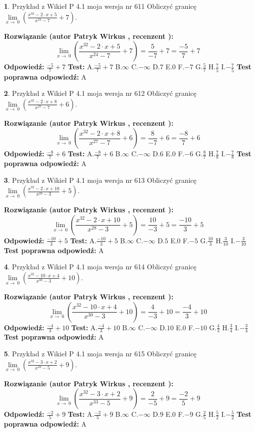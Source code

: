 \documentclass[12pt, a4paper]{article}
\theoremstyle{definition} %
\newtheorem{zad}{}
\newcommand{\zadStart}[1]{\begin{zad}#1\newline}
\newcommand{\zadStop}{\end{zad}}
\newcommand{\rozwStart}[2]{\noindent \textbf{Rozwiązanie (autor #1 , recenzent #2): }\newline}
\newcommand{\rozwStop}{\newline}
\newcommand{\odpStart}{\noindent \textbf{Odpowiedź:}\newline}
\newcommand{\odpStop}{\newline}
\newcommand{\testStart}{\noindent \textbf{Test:}\newline}
\newcommand{\testStop}{\newline}
\newcommand{\kluczStart}{\noindent \textbf{Test poprawna odpowiedź:}\newline}
\newcommand{\kluczStop}{\newline}
\begin{document}
\zadStart{Przykład z Wikieł P 4.1 moja wersja nr 611}
Obliczyć granicę $\lim\limits_{x\to\ 0}(\frac{x^{32}-2 \cdot x +5}{x^{24}-7}+7)$.
\zadStop
\rozwStart{Patryk Wirkus}{}
$$\lim\limits_{x\to\ 0}(\frac{x^{32}-2 \cdot x +5}{x^{24}-7}+7)=\frac{5}{-7}+7=\frac{-5}{7}+7$$
\rozwStop
\odpStart
$\frac{-5}{7}+7$
\odpStop
\testStart
A.$\frac{-5}{7}+7$
B.$\infty$
C.$-\infty$
D.$7$
E.$0$
F.$-7$
G.$\frac{5}{7}$
H.$\frac{7}{5}$
I.$-\frac{7}{5}$
\testStop
\kluczStart
A
\kluczStop



\zadStart{Przykład z Wikieł P 4.1 moja wersja nr 612}
Obliczyć granicę $\lim\limits_{x\to\ 0}(\frac{x^{32}-2 \cdot x +8}{x^{27}-7}+6)$.
\zadStop
\rozwStart{Patryk Wirkus}{}
$$\lim\limits_{x\to\ 0}(\frac{x^{32}-2 \cdot x +8}{x^{27}-7}+6)=\frac{8}{-7}+6=\frac{-8}{7}+6$$
\rozwStop
\odpStart
$\frac{-8}{7}+6$
\odpStop
\testStart
A.$\frac{-8}{7}+6$
B.$\infty$
C.$-\infty$
D.$6$
E.$0$
F.$-6$
G.$\frac{8}{7}$
H.$\frac{7}{8}$
I.$-\frac{7}{8}$
\testStop
\kluczStart
A
\kluczStop



\zadStart{Przykład z Wikieł P 4.1 moja wersja nr 613}
Obliczyć granicę $\lim\limits_{x\to\ 0}(\frac{x^{32}-2 \cdot x +10}{x^{28}-3}+5)$.
\zadStop
\rozwStart{Patryk Wirkus}{}
$$\lim\limits_{x\to\ 0}(\frac{x^{32}-2 \cdot x +10}{x^{28}-3}+5)=\frac{10}{-3}+5=\frac{-10}{3}+5$$
\rozwStop
\odpStart
$\frac{-10}{3}+5$
\odpStop
\testStart
A.$\frac{-10}{3}+5$
B.$\infty$
C.$-\infty$
D.$5$
E.$0$
F.$-5$
G.$\frac{10}{3}$
H.$\frac{3}{10}$
I.$-\frac{3}{10}$
\testStop
\kluczStart
A
\kluczStop



\zadStart{Przykład z Wikieł P 4.1 moja wersja nr 614}
Obliczyć granicę $\lim\limits_{x\to\ 0}(\frac{x^{32}-10 \cdot x +4}{x^{30}-3}+10)$.
\zadStop
\rozwStart{Patryk Wirkus}{}
$$\lim\limits_{x\to\ 0}(\frac{x^{32}-10 \cdot x +4}{x^{30}-3}+10)=\frac{4}{-3}+10=\frac{-4}{3}+10$$
\rozwStop
\odpStart
$\frac{-4}{3}+10$
\odpStop
\testStart
A.$\frac{-4}{3}+10$
B.$\infty$
C.$-\infty$
D.$10$
E.$0$
F.$-10$
G.$\frac{4}{3}$
H.$\frac{3}{4}$
I.$-\frac{3}{4}$
\testStop
\kluczStart
A
\kluczStop



\zadStart{Przykład z Wikieł P 4.1 moja wersja nr 615}
Obliczyć granicę $\lim\limits_{x\to\ 0}(\frac{x^{32}-3 \cdot x +2}{x^{33}-5}+9)$.
\zadStop
\rozwStart{Patryk Wirkus}{}
$$\lim\limits_{x\to\ 0}(\frac{x^{32}-3 \cdot x +2}{x^{33}-5}+9)=\frac{2}{-5}+9=\frac{-2}{5}+9$$
\rozwStop
\odpStart
$\frac{-2}{5}+9$
\odpStop
\testStart
A.$\frac{-2}{5}+9$
B.$\infty$
C.$-\infty$
D.$9$
E.$0$
F.$-9$
G.$\frac{2}{5}$
H.$\frac{5}{2}$
I.$-\frac{5}{2}$
\testStop
\kluczStart
A
\kluczStop
\end{document}
